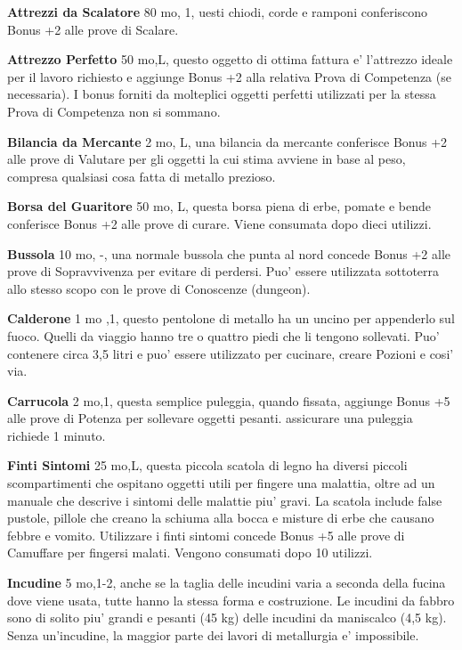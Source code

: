 \documentclass[a4paper,11pt,twoside,openany]{book}
\begin{document}
{\textbf{Attrezzi da Scalatore} 80 mo, 1, uesti chiodi, corde e ramponi conferiscono Bonus +2 alle prove di Scalare.

\textbf{Attrezzo Perfetto} 50 mo,L, questo oggetto di ottima fattura e' l'attrezzo ideale per il lavoro richiesto e aggiunge Bonus +2 alla relativa Prova di Competenza (se necessaria). I bonus forniti da molteplici oggetti perfetti utilizzati per la stessa Prova di Competenza non si sommano.

\textbf{Bilancia da Mercante} 2 mo, L, una bilancia da mercante conferisce Bonus +2 alle prove di Valutare per gli oggetti la cui stima avviene in base al peso, compresa qualsiasi cosa fatta di metallo prezioso.

\textbf{Borsa del Guaritore} 50 mo, L, questa borsa piena di erbe, pomate e bende conferisce Bonus +2 alle prove di curare. Viene consumata dopo dieci utilizzi.

\textbf{Bussola} 10 mo, -, una normale bussola che punta al nord concede Bonus +2 alle prove di Sopravvivenza per evitare di perdersi. Puo' essere utilizzata sottoterra allo stesso scopo con le prove di Conoscenze (dungeon).

\textbf{Calderone} 1 mo ,1, questo pentolone di metallo ha un uncino per appenderlo sul fuoco. Quelli da viaggio hanno tre o quattro piedi che li tengono sollevati. Puo' contenere circa 3,5 litri e puo' essere utilizzato per cucinare, creare Pozioni e cosi' via.

\textbf{Carrucola} 2 mo,1, questa semplice puleggia, quando fissata, aggiunge Bonus +5 alle prove di Potenza per sollevare oggetti pesanti. assicurare una puleggia richiede 1 minuto.

\textbf{Finti Sintomi} 25 mo,L, questa piccola scatola di legno ha diversi piccoli scompartimenti che ospitano oggetti utili per fingere una malattia, oltre ad un manuale che descrive i sintomi delle malattie piu' gravi. La scatola include false pustole, pillole che creano la schiuma alla bocca e misture di erbe che causano febbre e vomito. 
Utilizzare i finti sintomi concede Bonus +5 alle prove di Camuffare per fingersi malati. Vengono consumati dopo 10 utilizzi.

\textbf{Incudine} 5 mo,1-2, anche se la taglia delle incudini varia a seconda della fucina dove viene usata, tutte hanno la stessa forma e costruzione. Le incudini da fabbro sono di solito piu' grandi e pesanti (45 kg) delle incudini da maniscalco (4,5 kg). 
Senza un'incudine, la maggior parte dei lavori di metallurgia e' impossibile.

}
\end{document}
